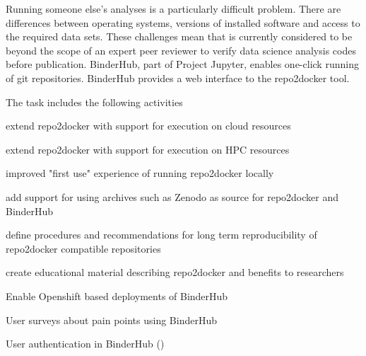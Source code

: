 \begin{task}[
  title=Further development of repo2docker and Binder,
  id=r2d-and-binder,
  lead=SRL,
  PM=42,
  wphases={0-48},
  partners={XFEL,SRL,WTT}
]
  Running someone else's analyses is a particularly difficult problem.
  There are differences between operating systems, versions of installed software and access to the required data sets.
  These challenges mean that is currently considered to be beyond the scope of an expert peer reviewer to verify data science analysis codes before publication.
  BinderHub, part of Project Jupyter, enables one-click running of git repositories.
  BinderHub provides a web interface to the repo2docker tool.

  The task includes the following activities
  \begin{compactitem}
  \item extend repo2docker with support for execution on cloud resources
  \item extend repo2docker with support for execution on HPC resources
  \item improved "first use" experience of running repo2docker locally
  \item add support for using archives such as Zenodo as source for repo2docker and BinderHub
  \item define procedures and recommendations for long term reproducibility of repo2docker compatible repositories
  \item create educational material describing repo2docker and benefits to researchers
  \item Enable Openshift based deployments of BinderHub
  \item User surveys about pain points using BinderHub
  \item User authentication in BinderHub
    ()
  \end{compactitem}
\end{task}
